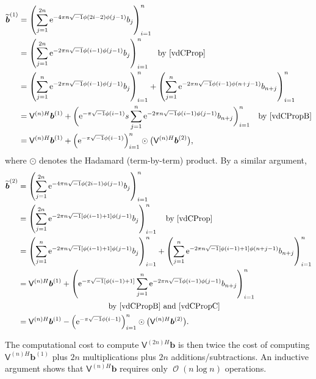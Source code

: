 \documentclass{iitthesis}          %
\DeclareMathOperator{\Order}{{\mathcal O}}
\newcommand{\bm}[1]{\boldsymbol{#1}}
\newcommand{\vb}{\bm{b}}
\newcommand{\mV}{\mathsf{V}}
\newcommand{\me}{\mathrm{e}}
\begin{document}
\begin{align*}
\widetilde{\vb}^{(1)} &= \left( \sum_{j=1}^{2n}  \me^{-4 \pi n \sqrt{-1} \phi(2i-2)\phi(j-1)} b_{j} \right)_{i=1}^n \\
&= \left( \sum_{j=1}^{2n}  \me^{-2 \pi n \sqrt{-1} \phi(i-1)\phi(j-1)} b_{j} \right)_{i=1}^n \quad \text{by \eqref{vdCProp}}\\
&= \left( \sum_{j=1}^{n}  \me^{-2 \pi n \sqrt{-1} \phi(i-1)\phi(j-1)} b_{j} \right)_{i=1}^n  +  \left( \sum_{j=1}^{n}  \me^{-2 \pi n \sqrt{-1} \phi(i-1)\phi(n+j-1)} b_{n+j} \right)_{i=1}^n \\
&= \mV^{(n)H}\vb^{(1)}  +  \biggl(  \me^{-\pi \sqrt{-1} \phi(i-1)}  s \sum_{j=1}^{n}  \me^{-2 \pi n \sqrt{-1} \phi(i-1)\phi(j-1)} b_{n+j} \biggr)_{i=1}^n \quad  \text{by \eqref{vdCPropB}}\\
&= \mV^{(n)H}\vb^{(1)} +  \left(  \me^{-\pi \sqrt{-1} \phi(i-1)} \right)_{i=1}^n \odot \bigl(\mV^{(n)H}\vb^{(2)} \bigr),
\end{align*}
where $\odot$ denotes the Hadamard (term-by-term) product.  By a similar argument, 
\begin{align*}
\widetilde{\vb}^{(2)} &= \left( \sum_{j=1}^{2n}  \me^{-4 \pi n \sqrt{-1} \phi(2i-1)\phi(j-1)} b_{j} \right)_{i=1}^n \\
&= \left( \sum_{j=1}^{2n}  \me^{-2 \pi n \sqrt{-1} [\phi(i-1)+1]\phi(j-1)} b_{j} \right)_{i=1}^n \quad \text{by \eqref{vdCProp}}\\
&= \left( \sum_{j=1}^{n}  \me^{-2 \pi n \sqrt{-1} [\phi(i-1)+1]\phi(j-1)} b_{j} \right)_{i=1}^n 
 +  \left( \sum_{j=1}^{n}  \me^{-2 \pi n \sqrt{-1} [\phi(i-1)+1]\phi(n+j-1)} b_{n+j} \right)_{i=1}^n \\
&= \mV^{(n)H}\vb^{(1)} 
+  \left(  \me^{ -\pi \sqrt{-1} [\phi(i-1) + 1]}  \sum_{j=1}^{n}  \me^{-2 \pi n \sqrt{-1} \phi(i-1)\phi(j-1)} b_{n+j} \right)_{i=1}^n \\
& \hspace{4cm}  \text{by \eqref{vdCPropB} and \eqref{vdCPropC}}\\
&= \mV^{(n)H}\vb^{(1)} -  \left(  \me^{-\pi \sqrt{-1} \phi(i-1)} \right)_{i=1}^n \odot \bigl(\mV^{(n)H}\vb^{(2)} \bigr).
\end{align*}

The computational cost to compute $\mV^{(2n)H}\vb$ is then twice the cost of computing $\mV^{(n)H}\vb^{(1)}$ plus $2n$ multiplications plus $2n$ additions/subtractions.  An inductive argument shows that $\mV^{(n)H}\vb$ requires only $\Order(n \log n)$ operations.

\label{sec:non_integer_kernel_order}
\end{document}
